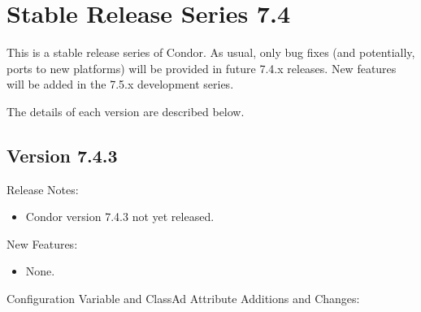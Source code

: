 
\section{\label{sec:History-7-4}Stable Release Series 7.4}

This is a stable release series of Condor.
As usual, only bug fixes (and potentially, ports to new platforms)
will be provided in future 7.4.x releases.
New features will be added in the 7.5.x development series.

The details of each version are described below.

\subsection*{\label{sec:New-7-4-3}Version 7.4.3}

\noindent Release Notes:

\begin{itemize}

\item Condor version 7.4.3 not yet released.

\end{itemize}


\noindent New Features:

\begin{itemize}

\item None.

\end{itemize}

\noindent Configuration Variable and ClassAd Attribute Additions and Changes:

